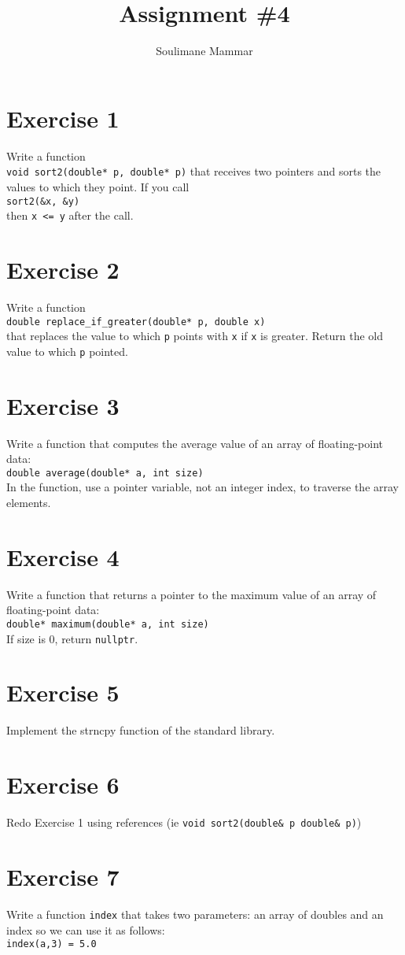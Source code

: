 \documentclass[10pt,a4paper]{article}
\author{Soulimane Mammar}
\title{Assignment \#4}
\begin{document}
	\maketitle
	
	\section*{Exercise 1}
	Write a function\\
	\verb|void sort2(double* p, double* p)|
	that receives two pointers and sorts the values to which they point. If you call\\
	\verb|sort2(&x, &y)|\\
	then \verb|x <= y| after the call.
	
	\section*{Exercise 2}
	Write a function \\
	\verb|double replace_if_greater(double* p, double x)|\\
	that replaces the value to which \verb|p| points with \verb|x| if \verb|x| is greater. Return the old value to which \verb|p| pointed.
	
	\section*{Exercise 3}
	Write a function that computes the average value of an array of floating-point data:\\
	\verb|double average(double* a, int size)|\\
	In the function, use a pointer variable, not an integer index, to traverse the array
	elements.
	
	\section*{Exercise 4}
	Write a function that returns a pointer to the maximum value of an array of floating-point data:\\
	\verb|double* maximum(double* a, int size)|\\
	If size is 0, return \verb|nullptr|.
	
	\section*{Exercise 5}
	Implement the strncpy function of the standard library.
	
	\section*{Exercise 6}
	Redo Exercise 1 using references (ie \verb|void sort2(double& p double& p)|)
	
	\section*{Exercise 7}
	Write a function \verb|index| that takes two parameters: an array of doubles and an index
	so we can use it as follows:\\
	\verb|index(a,3) = 5.0|
\end{document}
